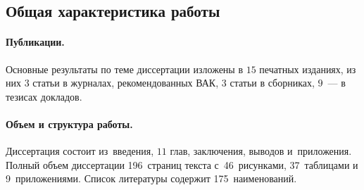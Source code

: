 \subsection*{Общая характеристика работы}
\fontsize{14pt}{15pt}\selectfont


\paragraph{Публикации.} Основные результаты по теме диссертации изложены в $15$ печатных изданиях, из них $3$ статьи в журналах, рекомендованных ВАК, $3$ статьи в сборниках, $9$~--- в тезисах докладов.

\paragraph{Объем и структура работы.} Диссертация состоит из~введения, $11$ глав, заключения, выводов и~приложения. Полный объем диссертации 196~страниц текста с~46~рисунками, 37~таблицами и 9~приложениями. Список литературы содержит 175~наименований.

